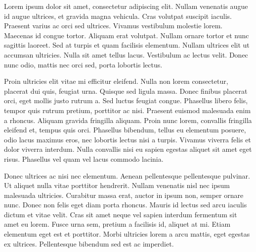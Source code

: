 Lorem ipsum dolor sit amet, consectetur adipiscing elit. Nullam venenatis augue id augue ultrices, et gravida magna vehicula. Cras volutpat suscipit iaculis. Praesent varius ac orci sed ultrices. Vivamus vestibulum molestie lorem. Maecenas id congue tortor. Aliquam erat volutpat. Nullam ornare tortor et nunc sagittis laoreet. Sed at turpis et quam facilisis elementum. Nullam ultrices elit ut accumsan ultricies. Nulla sit amet tellus lacus. Vestibulum ac lectus velit. Donec nunc odio, mattis nec orci sed, porta lobortis lectus.

Proin ultricies elit vitae mi efficitur eleifend. Nulla non lorem consectetur, placerat dui quis, feugiat urna. Quisque sed ligula massa. Donec finibus placerat orci, eget mollis justo rutrum a. Sed luctus feugiat congue. Phasellus libero felis, tempor quis rutrum pretium, porttitor ac nisi. Praesent euismod malesuada enim a rhoncus. Aliquam gravida fringilla aliquam. Proin nunc lorem, convallis fringilla eleifend et, tempus quis orci. Phasellus bibendum, tellus eu elementum posuere, odio lacus maximus eros, nec lobortis lectus nisi a turpis. Vivamus viverra felis et dolor viverra interdum. Nulla convallis nisi eu sapien egestas aliquet sit amet eget risus. Phasellus vel quam vel lacus commodo lacinia.

Donec ultrices ac nisi nec elementum. Aenean pellentesque pellentesque pulvinar. Ut aliquet nulla vitae porttitor hendrerit. Nullam venenatis nisl nec ipsum malesuada ultricies. Curabitur massa erat, auctor in ipsum non, semper ornare nunc. Donec non felis eget diam porta rhoncus. Mauris id lectus sed arcu iaculis dictum et vitae velit. Cras sit amet neque vel sapien interdum fermentum sit amet eu lorem. Fusce urna sem, pretium a facilisis id, aliquet at mi. Etiam elementum eget est et porttitor. Morbi ultricies lorem a arcu mattis, eget egestas ex ultrices. Pellentesque bibendum sed est ac imperdiet.